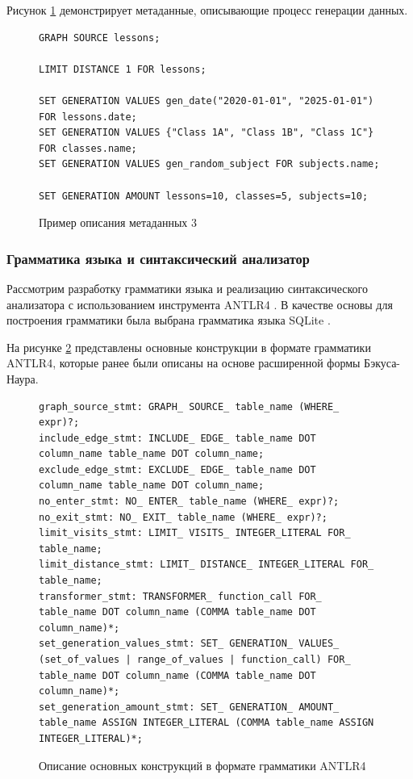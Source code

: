 Рисунок \ref{metadata-example-3} демонстрирует метаданные, описывающие процесс генерации данных.

\begin{figure}
  \begin{lstlisting}
GRAPH SOURCE lessons;

LIMIT DISTANCE 1 FOR lessons;

SET GENERATION VALUES gen_date("2020-01-01", "2025-01-01") FOR lessons.date;
SET GENERATION VALUES {"Class 1A", "Class 1B", "Class 1C"} FOR classes.name;
SET GENERATION VALUES gen_random_subject FOR subjects.name;

SET GENERATION AMOUNT lessons=10, classes=5, subjects=10;
  \end{lstlisting}
  \caption{Пример описания метаданных 3}
  \label{metadata-example-3}
\end{figure}

\subsubsection{Грамматика языка и синтаксический анализатор}
Рассмотрим разработку грамматики языка и реализацию синтаксического анализатора \cite{parsers} с использованием инструмента ANTLR4 \cite{antlr}. В качестве основы для построения грамматики была выбрана грамматика языка SQLite \cite{sqlite-parser}.

На рисунке \ref{antlr4-grammar} представлены основные конструкции в формате грамматики ANTLR4, которые ранее были описаны на основе расширенной формы Бэкуса-Наура.

\begin{figure}
  \begin{lstlisting}
graph_source_stmt: GRAPH_ SOURCE_ table_name (WHERE_ expr)?;
include_edge_stmt: INCLUDE_ EDGE_ table_name DOT column_name table_name DOT column_name;
exclude_edge_stmt: EXCLUDE_ EDGE_ table_name DOT column_name table_name DOT column_name;
no_enter_stmt: NO_ ENTER_ table_name (WHERE_ expr)?;
no_exit_stmt: NO_ EXIT_ table_name (WHERE_ expr)?;
limit_visits_stmt: LIMIT_ VISITS_ INTEGER_LITERAL FOR_ table_name;
limit_distance_stmt: LIMIT_ DISTANCE_ INTEGER_LITERAL FOR_ table_name;
transformer_stmt: TRANSFORMER_ function_call FOR_ table_name DOT column_name (COMMA table_name DOT column_name)*;
set_generation_values_stmt: SET_ GENERATION_ VALUES_ (set_of_values | range_of_values | function_call) FOR_ table_name DOT column_name (COMMA table_name DOT column_name)*;
set_generation_amount_stmt: SET_ GENERATION_ AMOUNT_ table_name ASSIGN INTEGER_LITERAL (COMMA table_name ASSIGN INTEGER_LITERAL)*;
  \end{lstlisting}
  \caption{Описание основных конструкций в формате грамматики ANTLR4}
  \label{antlr4-grammar}
\end{figure}

